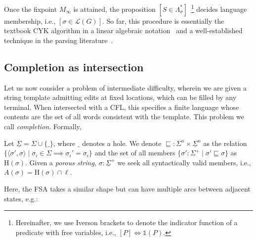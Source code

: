 \documentclass[sigplan,acmsmall,nonacm,screen]{acmart}\settopmatter{printfolios=false,printccs=false,printacmref=false}
\begin{document}
Once the fixpoint $M_\infty$ is attained, the proposition $[S \in \Lambda^*_\sigma]$~\footnote{Hereinafter, we use Iverson brackets to denote the indicator function of a predicate with free variables, i.e., $[P] \Leftrightarrow \mathds{1}(P)$.} decides language membership, i.e., $[\sigma \in \mathcal{L}(G)]$. So far, this procedure is essentially the textbook CYK algorithm in a linear algebraic notation~\cite{goodman1999semiring} and a well-established technique in the parsing literature~\cite{grune2008}.

\subsection{Completion as intersection}

Let us now consider a problem of intermediate difficulty, wherein we are given a string template admitting edits at fixed locations, which can be filled by any terminal. When intersected with a CFL, this specifies a finite language whose contents are the set of all words consistent with the template. This problem we call \textit{completion}. Formally,

\begin{definition}[Completion]
  Let $\underline\Sigma = \Sigma \cup \{\_\}$, where $\_$ denotes a hole. We denote $\sqsubseteq: \Sigma^n \times \underline\Sigma^n$ as the relation $\{\langle\sigma', \sigma\rangle \mid \sigma_i \in \Sigma \implies \sigma_i' = \sigma_i\}$ and the set of all members $\{\sigma': \Sigma^+ \mid \sigma' \sqsubseteq \sigma\}$ as $\text{H}(\sigma)$. Given a \textit{porous string}, $\sigma: \underline\Sigma^+$ we seek all syntactically valid members, i.e., $A(\sigma)=\text{H}(\sigma)\cap\ell$.
\end{definition}

Here, the FSA takes a similar shape but can have multiple arcs between adjacent states, e.g.:

\begin{figure}[H]
\end{figure}
\end{document}

